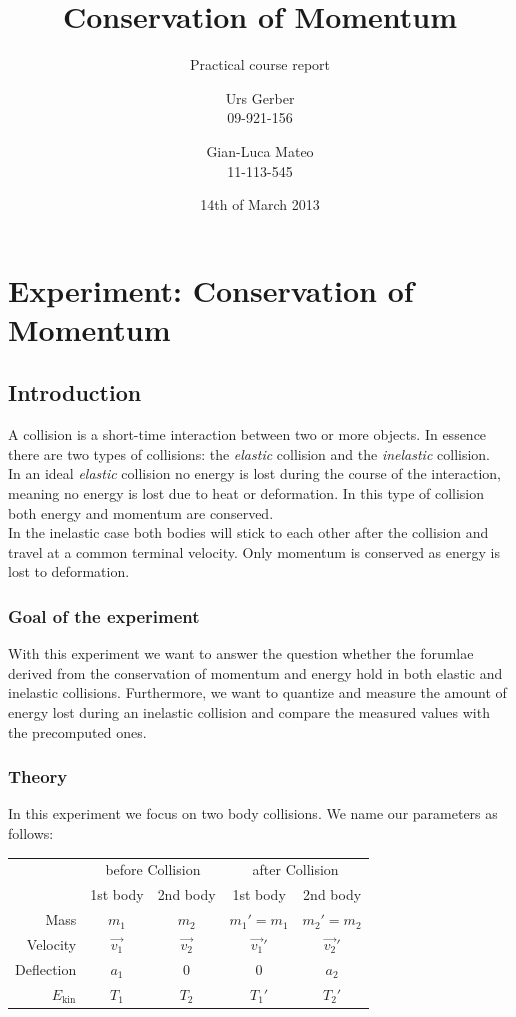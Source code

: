 \documentclass{scrreprt}
\author{Urs Gerber\\09-921-156 \and Gian-Luca Mateo\\11-113-545}
\date{14th of March 2013}
\title{Conservation of Momentum}
\subtitle{Practical course report}
\renewcommand{\emph}[1]{\textit{#1}}
\begin{document}
\maketitle

\tableofcontents
\newpage

\chapter{Experiment: Conservation of Momentum}
\section{Introduction}
A collision is a short-time interaction between two or more objects. In essence there are two types of collisions: the \emph{elastic} collision and the \emph{inelastic} collision.\\
In an ideal \emph{elastic} collision no energy is lost during the course of the interaction, meaning no energy is lost due to heat or deformation. In this type of collision both energy and momentum are conserved.\\
In the inelastic case both bodies will stick to each other after the collision and travel at a common terminal velocity. Only momentum is conserved as energy is lost to deformation.
 
\subsection{Goal of the experiment}
With this experiment we want to answer the question whether the forumlae derived from the conservation of momentum and energy hold in both elastic and inelastic collisions. Furthermore, we want to quantize and measure the amount of energy lost during an inelastic collision and compare the measured values with the precomputed ones.
\subsection{Theory}
In this experiment we focus on two body collisions. We name our parameters as follows:

\begin{table}[H]
\center
\begin{tabular}{|r|cc|cc|}
\hline

 & \multicolumn{2}{c|}{before Collision} &  \multicolumn{2}{c|}{after Collision}\\
 & 1st body & 2nd body & 1st body & 2nd body\\ \hline\hline
 Mass & $m_1$ & $m_2$ & $m_1'=m_1$ & $m_2'=m_2$\\
 Velocity & $\vec{v_1}$ & $\vec{v_2}$ & $\vec{v_1}'$ & $\vec{v_2}'$\\
 Deflection & $a_1$ & 0 & 0 & $a_2$ \\
 $E_{\text{kin}}$ & $T_1$ & $T_2$ & $T_1'$ & $T_2'$\\

\hline
\end{tabular}
\end{table}
\end{document}
